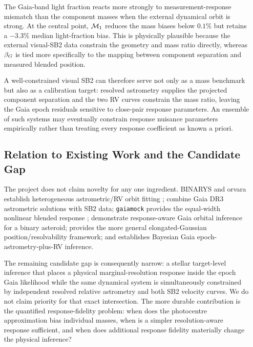 The Gaia-band light fraction reacts more strongly to measurement-response mismatch than the component masses when the external dynamical orbit is strong. At the central point, $\mathcal{M}_1$ reduces the mass biases below $0.1\%$ but retains a $-3.3\%$ median light-fraction bias. This is physically plausible because the external visual-SB2 data constrain the geometry and mass ratio directly, whereas $\beta_G$ is tied more specifically to the mapping between component separation and measured blended position.

A well-constrained visual SB2 can therefore serve not only as a mass benchmark but also as a calibration target: resolved astrometry supplies the projected component separation and the two RV curves constrain the mass ratio, leaving the Gaia epoch residuals sensitive to close-pair response parameters. An ensemble of such systems may eventually constrain response nuisance parameters empirically rather than treating every response coefficient as known a priori.

\subsection{Relation to Existing Work and the Candidate Gap}

The project does not claim novelty for any one ingredient. BINARYS and orvara establish heterogeneous astrometric/RV orbit fitting \citep{Brandt2021,Leclerc2023}; \citet{Chevalier2023} combine Gaia DR3 astrometric solutions with SB2 data; \texttt{gaiamock} provides the equal-width nonlinear blended response \citep{ElBadry2024}; \citet{Liu2024} demonstrate response-aware Gaia orbital inference for a binary asteroid; \citet{Penoyre2026} provides the more general elongated-Gaussian position/resolvability framework; and \citet{Baycroft2026} establishes Bayesian Gaia epoch-astrometry-plus-RV inference.

The remaining candidate gap is consequently narrow: a stellar target-level inference that places a physical marginal-resolution response inside the epoch Gaia likelihood while the same dynamical system is simultaneously constrained by independent resolved relative astrometry and both SB2 velocity curves. We do not claim priority for that exact intersection. The more durable contribution is the quantified response-fidelity problem: when does the photocentre approximation bias individual masses, when is a simpler resolution-aware response sufficient, and when does additional response fidelity materially change the physical inference?

